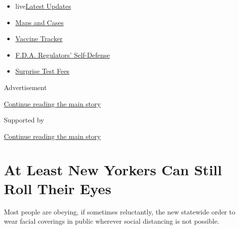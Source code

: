 \begin{itemize}
\tightlist
\item
  live\href{https://www.nytimes3xbfgragh.onion/2020/09/11/world/covid-19-coronavirus.html?name=styln-coronavirus-national\&region=TOP_BANNER\&block=storyline_menu_recirc\&action=click\&pgtype=Article\&impression_id=375580b1-f4c0-11ea-ab40-e781aaaeae39\&variant=undefined}{Latest
  Updates}
\item
  \href{https://www.nytimes3xbfgragh.onion/interactive/2020/us/coronavirus-us-cases.html?name=styln-coronavirus-national\&region=TOP_BANNER\&block=storyline_menu_recirc\&action=click\&pgtype=Article\&impression_id=3755a7c0-f4c0-11ea-ab40-e781aaaeae39\&variant=undefined}{Maps
  and Cases}
\item
  \href{https://www.nytimes3xbfgragh.onion/interactive/2020/science/coronavirus-vaccine-tracker.html?name=styln-coronavirus-national\&region=TOP_BANNER\&block=storyline_menu_recirc\&action=click\&pgtype=Article\&impression_id=3755a7c1-f4c0-11ea-ab40-e781aaaeae39\&variant=undefined}{Vaccine
  Tracker}
\item
  \href{https://www.nytimes3xbfgragh.onion/2020/09/10/us/politics/fda-coronavirus-vaccine.html?name=styln-coronavirus-national\&region=TOP_BANNER\&block=storyline_menu_recirc\&action=click\&pgtype=Article\&impression_id=3755a7c2-f4c0-11ea-ab40-e781aaaeae39\&variant=undefined}{F.D.A.
  Regulators' Self-Defense}
\item
  \href{https://www.nytimes3xbfgragh.onion/2020/09/09/upshot/coronavirus-surprise-test-fees.html?name=styln-coronavirus-national\&region=TOP_BANNER\&block=storyline_menu_recirc\&action=click\&pgtype=Article\&impression_id=3755a7c3-f4c0-11ea-ab40-e781aaaeae39\&variant=undefined}{Surprise
  Test Fees}
\end{itemize}

Advertisement

\protect\hyperlink{after-top}{Continue reading the main story}

Supported by

\protect\hyperlink{after-sponsor}{Continue reading the main story}

\hypertarget{at-least-new-yorkers-can-still-roll-their-eyes}{%
\section{At Least New Yorkers Can Still Roll Their
Eyes}\label{at-least-new-yorkers-can-still-roll-their-eyes}}

Most people are obeying, if sometimes reluctantly, the new statewide
order to wear facial coverings in public wherever social distancing is
not possible.

